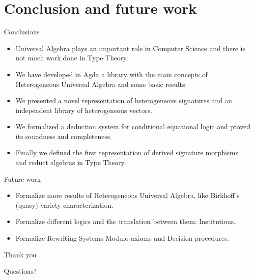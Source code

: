 \documentclass[11pt]{beamer}
\begin{document}
\section{Conclusion and future work}

\begin{frame}{Conclusions}
  \begin{itemize}[<+->]
    
  \item Universal Algebra plays an important role in Computer Science
    and there is not much work done in Type Theory.
    
  \item We have developed in Agda a library with the main concepts of
    Heterogeneous Universal Algebra and some basic results.

  \item We presented a novel representation of heterogeneous signatures
    and an independent library of heterogeneous vectors.  

  \item We formalized a deduction system for conditional equational
    logic and proved its soundness and completeness.

  \item Finally we defined the first representation of derived
    signature morphisms and reduct algebras in Type Theory.
        
  \end{itemize}
\end{frame}

\begin{frame}{Future work}

  \begin{itemize}[<+->]
    \setlength\itemsep{1em}
  \item Formalize more results of Heterogeneous Universal Algebra, like Birkhoff's
    (quasy)-variety characterization.
    
  \item Formalize different logics and the translation between them: Institutions.
    
  \item Formalize Rewriting Systems Modulo axioms and Decision procedures.

  \end{itemize}
\end{frame}


\begin{frame}{Thank you}

  Questions?
  
\end{frame}
\end{document}
